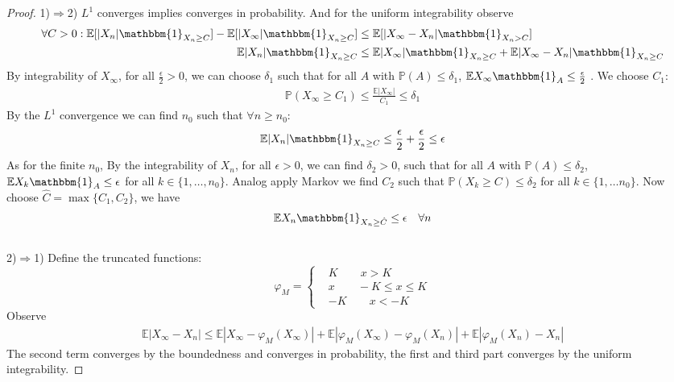 \documentclass[a4paper,11pt]{book}
\theoremstyle{definition}
\theoremstyle{remark}
\begin{document}
\begin{proof} 
	1)$\Rightarrow$2) $L^1$ converges implies converges in probability. And for the uniform integrability observe
	\begin{align*}
		\forall C > 0: \mathbb{E}[|X_n|\mathbbm{1}_{X_n \geq C}] - \mathbb{E}[|X_\infty| \mathbbm{1}_{X_n \geq C}] 
		&\leq \mathbb{E}[|X_\infty - X_n|\mathbbm{1}_{X_n > C}]\\
		\mathbb{E}|X_n| \mathbbm{1}_{X_n \ge C} &\le \mathbb{E}|X_\infty| \mathbbm{1}_{X_n \ge C} + \mathbb{E}|X_\infty - X_n|\mathbbm{1}_{X_n \ge C}
	\end{align*}
	By integrability of $X_\infty$, for all $\frac{\epsilon}{2} > 0$, we can choose $\delta_1$ such that for all $A$ with $\mathbb{P}(A) \le \delta_1$, $\mathbb{E}X_\infty\mathbbm{1}_{A} \le \frac{\epsilon}{2}$  
. We choose $C_1$:
\begin{align*}
	\mathbb{P}(X_\infty \ge C_1) \le \frac{\mathbb{E}|X_\infty|}{C_1} \le \delta_1
\end{align*}	
By the $L^1$ convergence we can find $n_0$ such that $\forall n \ge n_0$:
\begin{align*}
	\mathbb{E}|X_n|\mathbbm{1}_{X_n \ge C} \le \frac{\epsilon}{2} + \frac{\epsilon}{2} \le \epsilon
\end{align*} 
As for the finite $n_0$, By the integrability of $X_n$, for all $\epsilon >0$, we can find $\delta_2>0$, such that for all $A$ with $\mathbb{P}(A) \le \delta_2$, $\mathbb{E}X_k \mathbbm{1}_{A} \le \epsilon$ for all $k \in \{1, \dots, n_0\}$. Analog apply Markov we find $C_2$ such that $\mathbb{P}(X_k \ge C) \le \delta_2$ for all $k \in \{1, \dots n_0\}$. Now choose $\hat{C} = \max\{C_1, C_2\}$, we have
\begin{align*}
	\mathbb{E}X_n \mathbbm{1}_{X_n \ge \hat{C}} \le \epsilon \quad \forall n
\end{align*}
	\\2)$\Rightarrow$1)
	Define the truncated functions:
\begin{equation*}
	\varphi_M = \left\{
	\begin{aligned}
		&K \qquad x > K\\
		&x \qquad -K \le x \le K\\
		&-K \qquad x < -K
	\end{aligned}	
	\right.
	\end{equation*}
Observe
	\begin{align*}
		\mathbb{E}|X_\infty - X_n| \leq \mathbb{E}|X_\infty - \varphi_M(X_\infty)| + \mathbb{E}|\varphi_M(X_\infty) - \varphi_M(X_n)| + \mathbb{E}|\varphi_M(X_n) - X_n|
	\end{align*}
	The second term converges by the boundedness and converges in probability, the first and third part converges by the uniform integrability.
\end{proof}
\end{document}
